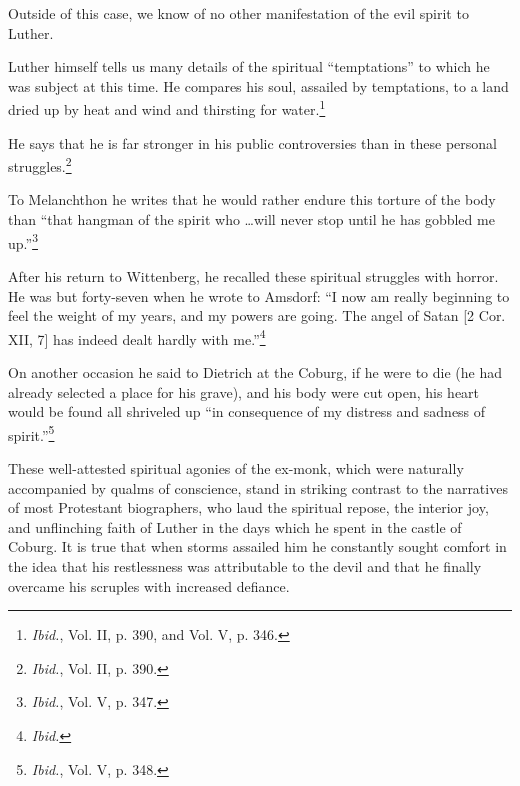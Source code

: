 Outside of this
case, we know of no other manifestation of the evil spirit to Luther.

Luther himself tells us many details of the spiritual “temptations”
to which he was subject at this time. He compares his soul, assailed
by temptations, to a land dried up by heat and wind and thirsting for
water.\footnote{\textit{Ibid.}, Vol. II, p. 390, and Vol. V, p. 346.}

He says that he is far stronger in his public controversies than
in these personal struggles.\footnote{\textit{Ibid.}, Vol. II, p. 390.}

To Melanchthon he writes that he would
rather endure this torture of the body than “that hangman of the
spirit who \dots will never stop until he has gobbled me up.”\footnote{\textit{Ibid.}, Vol. V, p. 347.}

After
his return to Wittenberg, he recalled these spiritual struggles with
horror. He was but forty-seven when he wrote to Amsdorf: “I now
am really beginning to feel the weight of my years, and my powers
are going. The angel of Satan [2 Cor. XII, 7] has indeed dealt hardly
with me.”\footnote{\textit{Ibid.}}

On another occasion he said to Dietrich at the Coburg,
if he were to die (he had already selected a place for his grave),
and his body were cut open, his heart would be found all shriveled
up “in consequence of my distress and sadness of spirit.”\footnote{\textit{Ibid.}, Vol. V, p. 348.}


These well-attested spiritual agonies of the ex-monk, which were
naturally accompanied by qualms of conscience, stand in striking
contrast to the narratives of most Protestant biographers, who laud
the spiritual repose, the interior joy, and unflinching faith of Luther
in the days which he spent in the castle of Coburg. It is true that when
storms assailed him he constantly sought comfort in the idea that his
restlessness was attributable to the devil and that he finally overcame
his scruples with increased defiance.

